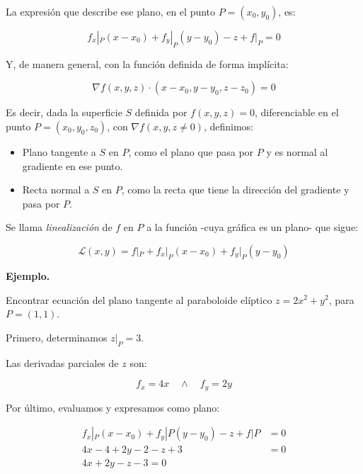 La expresión que describe ese plano,
en el punto \(P = (x_0, y_0)\), es:

\begin{equation*}
    f_x|_P(x - x_0) + f_y|_P(y - y_0) - z + f|_P = 0
\end{equation*}

Y, de manera general, con la función definida de forma implícita:

\begin{equation*}
    \nabla f(x,y,z)\cdot(x-x_0,y-y_0,z-z_0) = 0
\end{equation*}

Es decir,
dada la superficie \(S\) definida por \(f(x,y,z) = 0\),
diferenciable en el punto \(P = (x_0,y_0,z_0)\),
con \(\nabla f (x,y,z \neq 0)\),
definimos:
\begin{itemize}
    \item Plano tangente a \(S\) en \(P\),
          como el plano que pasa por \(P\) y es normal al gradiente en ese punto.
    \item Recta normal a \(S\) en \(P\),
          como la recta que tiene la dirección del gradiente y pasa por \(P\).
\end{itemize}

Se llama \textit{linealización} de \(f\) en \(P\) a la función
-cuya gráfica es un plano- que sigue:

\begin{equation*}
    \mathcal{L}(x,y)= f|_P + f_x|_P(x - x_0) + f_y|_P(y - y_0)
\end{equation*}

\vspace{.5cm}
\textbf{Ejemplo.}

Encontrar ecuación del plano tangente al paraboloide elíptico
\(z = 2x^{2} + y^{2}\),
para \(P = (1,1)\).

Primero, determinamos \(z|_P = 3\).

Las derivadas parciales de \(z\) son:

\begin{equation*}
    f_x = 4x \quad \land \quad f_y = 2y
\end{equation*}

Por último, evaluamos y expresamos como plano:

\begin{align*}
    f_x|_P(x - x_0) + f_y|P(y - y_0) - z + f|P & = 0 \\
    4x - 4 + 2y - 2 - z + 3                    & = 0 \\
    \boxed{4x + 2y - z - 3 = 0}                &
\end{align*}

